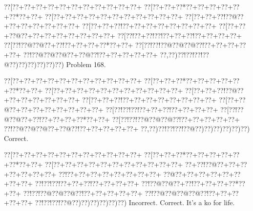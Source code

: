 \documentclass[a5paper]{article}
\begin{document}
\newpage
\begin{center}
{\goo
\0??[\0??+\0??+\0??+\0??+\0??+\0??+\0??+\0??+\0??+\0??+\0??+
\0??[\0??+\0??+\0??*\0??+\0??+\0??+\0??+\0??+\0??*\0??+\0??+
\0??[\0??+\0??+\0??+\0??+\0??+\0??+\0??+\0??+\0??+\0??+\0??+
\0??[\0??+\0??+\0??!\0??@\0??+\0??+\0??+\0??+\0??+\0??+\0??+
\0??[\0??+\0??+\0??!\0??+\0??+\0??+\0??+\0??+\0??+\0??+\0??+
\0??[\0??+\0??+\0??@\0??+\0??+\0??+\0??+\0??+\0??+\0??+\0??+
\0??[\0??!\0??+\0??!\0??!\0??+\0??+\0??!\0??+\0??+\0??+\0??+
\0??[\0??!\0??@\0??@\0??+\0??!\0??+\0??+\0??+\0??*\0??+\0??+
\0??[\0??!\0??!\0??@\0??@\0??@\0??!\0??+\0??+\0??+\0??+\0??+
\0??!\0??@\0??@\0??@\0??+\0??@\0??!\0??+\0??+\0??+\0??+\0??+
\0??,\0??)\0??!\0??!\0??!\0??@\0??)\0??)\0??)\0??)\0??)\0??)
}
Problem 168.

\end{center}
\begin{center}
{\goo
\0??[\0??+\0??+\0??+\0??+\0??+\0??+\0??+\0??+\0??+\0??+\0??+
\0??[\0??+\0??+\0??*\0??+\0??+\0??+\0??+\0??+\0??*\0??+\0??+
\0??[\0??+\0??+\0??+\0??+\0??+\0??+\0??+\0??+\0??+\0??+\0??+
\0??[\0??+\0??+\0??!\0??@\0??+\0??+\0??+\0??+\0??+\0??+\0??+
\0??[\0??+\0??+\0??!\0??+\0??+\0??+\0??+\0??+\0??+\0??+\0??+
\0??[\0??+\0??@\0??+\0??+\0??+\0??+\0??+\0??+\0??+\0??+
\0??[\0??!\0??!\0??!\0??+\0??+\0??!\0??+\0??+\0??+\0??+
\0??[\0??!\0??@\0??@\0??+\0??!\0??+\0??+\0??+\0??*\0??+\0??+
\0??[\0??!\0??!\0??@\0??@\0??@\0??!\0??+\0??+\0??+\0??+\0??+
\0??!\0??@\0??@\0??@\0??+\0??@\0??!\0??+\0??+\0??+\0??+\0??+
\0??,\0??)\0??!\0??!\0??!\0??@\0??)\0??)\0??)\0??)\0??)\0??)
}
Correct. 

\end{center}
\begin{center}
{\goo
\0??[\0??+\0??+\0??+\0??+\0??+\0??+\0??+\0??+\0??+\0??+\0??+
\0??[\0??+\0??+\0??*\0??+\0??+\0??+\0??+\0??+\0??*\0??+\0??+
\0??[\0??+\0??+\0??+\0??+\0??+\0??+\0??+\0??+\0??+\0??+\0??+
\0??+\0??!\0??@\0??+\0??+\0??+\0??+\0??+\0??+\0??+
\0??!\0??+\0??+\0??+\0??+\0??+\0??+\0??+\0??+
\0??@\0??+\0??+\0??+\0??+\0??+\0??+\0??+\0??+
\0??!\0??!\0??!\0??+\0??+\0??!\0??+\0??+\0??+\0??+
\0??!\0??@\0??@\0??+\0??!\0??+\0??+\0??+\0??*\0??+\0??+
\0??!\0??!\0??@\0??@\0??@\0??!\0??+\0??+\0??+\0??+\0??+
\0??!\0??@\0??@\0??@\0??@\0??!\0??+\0??+\0??+\0??+\0??+
\0??!\0??!\0??!\0??@\0??)\0??)\0??)\0??)\0??)\0??)
}
Incorrect. Correct. It's a ko for life.


\end{center}
\end{document}
